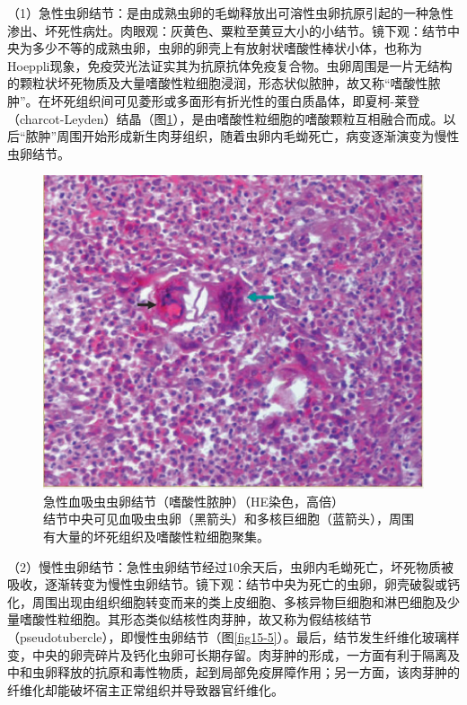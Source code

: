 （1）急性虫卵结节：是由成熟虫卵的毛蚴释放出可溶性虫卵抗原引起的一种急性渗出、坏死性病灶。肉眼观：灰黄色、粟粒至黄豆大小的小结节。镜下观：结节中央为多少不等的成熟虫卵，虫卵的卵壳上有放射状嗜酸性棒状小体，也称为Hoeppli现象，免疫荧光法证实其为抗原抗体免疫复合物。虫卵周围是一片无结构的颗粒状坏死物质及大量嗜酸性粒细胞浸润，形态状似脓肿，故又称“嗜酸性脓肿”。在坏死组织间可见菱形或多面形有折光性的蛋白质晶体，即夏柯-莱登（charcot-Leyden）结晶（图\ref{fig15-4}），是由嗜酸性粒细胞的嗜酸颗粒互相融合而成。以后“脓肿”周围开始形成新生肉芽组织，随着虫卵内毛蚴死亡，病变逐渐演变为慢性虫卵结节。

\begin{figure}[!htbp]
 \centering
 \includegraphics{./images/Image00248.jpg}
 \captionsetup{justification=centering}
 \caption{急性血吸虫虫卵结节（嗜酸性脓肿）（HE染色，高倍）\\ {\small 结节中央可见血吸虫虫卵（黑箭头）和多核巨细胞（蓝箭头），周围有大量的坏死组织及嗜酸性粒细胞聚集。}}
\label{fig15-4}
  \end{figure}

（2）慢性虫卵结节：急性虫卵结节经过10余天后，虫卵内毛蚴死亡，坏死物质被吸收，逐渐转变为慢性虫卵结节。镜下观：结节中央为死亡的虫卵，卵壳破裂或钙化，周围出现由组织细胞转变而来的类上皮细胞、多核异物巨细胞和淋巴细胞及少量嗜酸性粒细胞。其形态类似结核性肉芽肿，故又称为假结核结节（pseudotubercle），即慢性虫卵结节（图\ref{fig15-5}）。最后，结节发生纤维化玻璃样变，中央的卵壳碎片及钙化虫卵可长期存留。肉芽肿的形成，一方面有利于隔离及中和虫卵释放的抗原和毒性物质，起到局部免疫屏障作用；另一方面，该肉芽肿的纤维化却能破坏宿主正常组织并导致器官纤维化。

